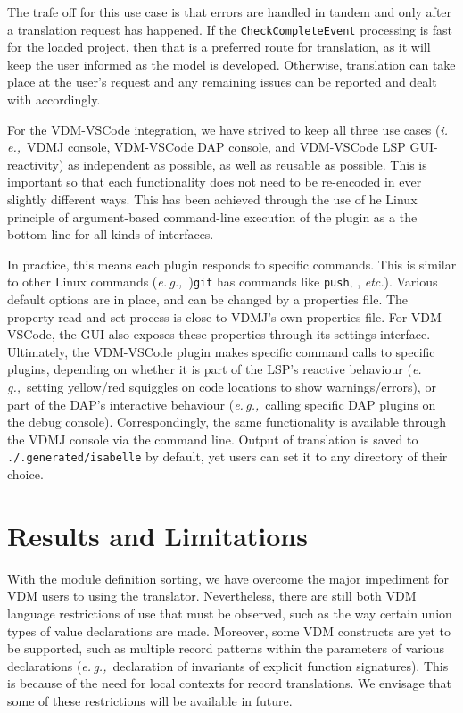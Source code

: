 \documentclass[runningheads,a4paper]{llncs}
\newcommand{\eg}{{\em e.\,g.,\/}}
\newcommand{\ie}{{\em i.\,e.,\/}}
\newcommand{\etc}{{\em etc.\/}}
\begin{document}
The trafe off for this use case is that errors are handled in tandem and only after a translation request has happened. If the \texttt{CheckCompleteEvent} processing is fast for the loaded project, then that is a preferred route for translation, as it will keep the user informed as the model is developed. Otherwise, translation can take place at the user's request and any remaining issues can be reported and dealt with accordingly.  

For the VDM-VSCode integration, we have strived to keep all three use cases (\ie~VDMJ console, VDM-VSCode DAP console, and VDM-VSCode LSP GUI-reactivity) as independent as possible, as well as reusable as possible. This is important so that each functionality does not need to be re-encoded in ever slightly different ways. This has been achieved through the use of he Linux principle of argument-based command-line execution of the plugin as a the bottom-line for all kinds of interfaces. 

In practice, this means each plugin responds to specific commands. This is similar to other Linux commands (\eg~)\texttt{git} has commands like \texttt{push}, , \etc). Various default options are in place, and can be changed by a properties file. The property read and set process is close to VDMJ's own properties file. For VDM-VSCode, the GUI also exposes these properties through its settings interface. Ultimately, the VDM-VSCode plugin makes specific command calls to specific plugins, depending on whether it is part of the LSP's reactive behaviour  (\eg~setting yellow/red squiggles on code locations to show warnings/errors), or part of the DAP's interactive behaviour (\eg~calling specific DAP plugins on the debug console). Correspondingly, the same functionality is available through the VDMJ console via the command line. Output of translation is saved to \texttt{./.generated/isabelle} by default, yet users can set it to any directory of their choice. 

\section{Results and Limitations}\label{sec:Examples}

With the module definition sorting, we have overcome the major impediment for VDM users to using the translator. Nevertheless, there are still both VDM language restrictions of use that must be observed, such as the way certain union types of value declarations are made. Moreover, some VDM constructs are yet to be supported, such as multiple record patterns within the parameters of various declarations (\eg~declaration of invariants of explicit function signatures). This is because of the need for local contexts for record translations. We envisage that some of these restrictions will be available in future. 
\end{document}
